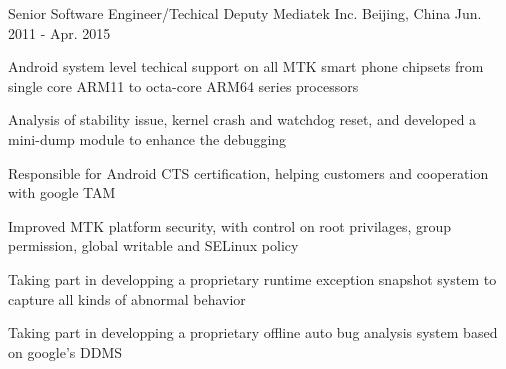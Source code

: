 \begin{cventries}
  \cventry
    {Senior Software Engineer/Techical Deputy} %
    {Mediatek Inc.} %
    {Beijing, China} %
    {Jun. 2011 - Apr. 2015} %
    {
      \begin{cvitems} %
        \item {Android system level techical support on all MTK smart phone chipsets from single core ARM11 to octa-core ARM64 series processors}
        \item {Analysis of stability issue, kernel crash and watchdog reset, and developed a mini-dump module to enhance the debugging}
        \item {Responsible for Android CTS certification, helping customers and cooperation with google TAM}
        \item {Improved MTK platform security, with control on root privilages, group permission, global writable and SELinux policy}
        \item {Taking part in developping a proprietary runtime exception snapshot system to capture all kinds of abnormal behavior}
        \item {Taking part in developping a proprietary offline auto bug analysis system based on google's DDMS}
      \end{cvitems}
    }


\end{cventries}
